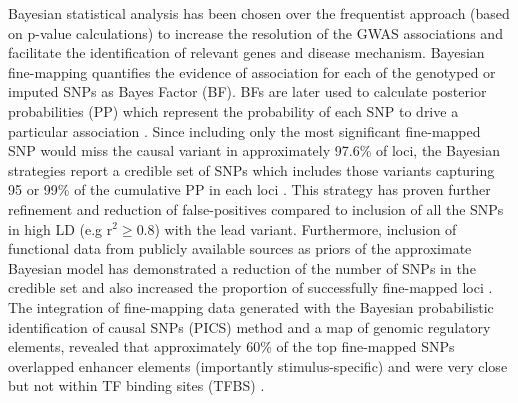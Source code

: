Bayesian statistical analysis has been chosen over the frequentist approach (based on p-value calculations) to increase the resolution of the GWAS associations and facilitate the identification of relevant genes and disease mechanism. Bayesian fine-mapping quantifies the evidence of association for each of the genotyped or imputed SNPs as Bayes Factor (BF). BFs are later used to calculate posterior probabilities (PP) which represent the probability of each SNP to drive a particular association \parencite{Wakefield2007}. Since including only the most significant fine-mapped SNP would miss the causal variant in approximately 97.6\% of loci, the Bayesian strategies report a credible set of SNPs which includes those variants capturing 95 or 99\% of the cumulative PP in each loci \parencite{Bunt2015}. This strategy has proven further refinement and reduction of false-positives compared to inclusion of all the SNPs in high LD (e.g r$^2\geq$0.8) with the lead variant\parencite{Bunt2015}. Furthermore, inclusion of functional data from publicly available sources as priors of the approximate Bayesian model has demonstrated a reduction of the number of SNPs in the credible set and also increased the proportion of successfully fine-mapped loci \parencite{Bunt2015, Kichaev2015}. The integration of fine-mapping data generated with the Bayesian probabilistic identification of causal SNPs (PICS) method and a map of genomic regulatory elements, revealed that approximately 60\% of the top fine-mapped SNPs overlapped enhancer elements (importantly stimulus-specific) and were very close but not within TF binding sites (TFBS) \parencite{Farh2015}. 


